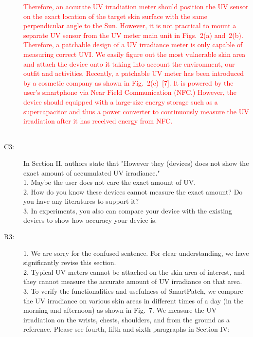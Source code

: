 \documentclass[onecolumn]{IEEEconf}
\begin{document}
\begin{description}
\textcolor{red}{Therefore, an accurate UV irradiation meter should position the UV sensor on the exact location of the target skin surface with the same perpendicular angle to the Sun. However, it is not practical to mount a separate UV sensor from the \textcolor{red}{UV meter main unit in Figs.~2(a) and~2(b)}. Therefore, a patchable design of a UV irradiance meter is only capable of measuring correct UVI. We easily figure out the most vulnerable skin area and attach the device onto it taking into account the environment, our outfit and activities. Recently, a patchable UV meter has been introduced by a cosmetic company as shown in Fig.~2(c)~[7]. It is powered by the user's smartphone via Near Field Communication (NFC.) However, the device should equipped with a large-size energy storage such as a supercapacitor and thus a power converter to continuously measure the UV irradiation after it has received energy from NFC.}\\
~\\

\item [C3: ] In Section II, authors state that "However they (devices) does not show the exact amount of accumulated UV irradiance." \\
1. Maybe the user does not care the exact amount of UV. \\
2. How do you know these devices cannot measure the exact amount? Do you have any literatures to support it?\\
3. In experiments, you also can compare your device with the existing devices to show how accuracy your device is.
\item [R3: ] 
1. We are sorry for the confused sentence. For clear understanding, we have significantly revise this section.\\
2. Typical UV meters cannot be attached on the skin area of interest, and they cannot measure the accurate amount of UV irradiance on that area.\\
3. To verify the functionalities and usefulness of SmartPatch, we compare the UV irradiance on various skin areas in different times of a day (in the morning and afternoon) as shown in Fig.~7. We measure the UV irradiation on the wrists, chests, shoulders, and from the ground as a reference. Please see fourth, fifth and sixth paragraphs in Section IV:\\


\end{description}
\end{document}
